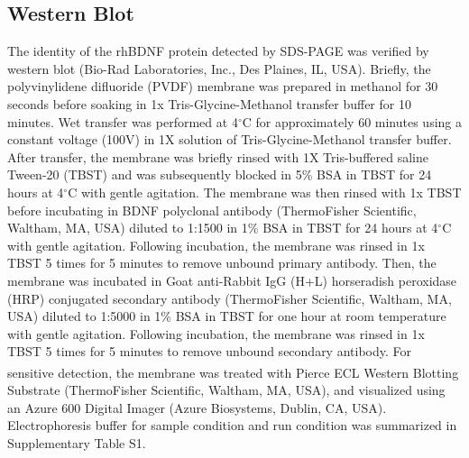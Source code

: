 \documentclass[review]{elsarticle}
\begin{document}
\subsection{Western Blot} 
The identity of the rhBDNF protein detected by SDS-PAGE was verified by western blot (Bio-Rad Laboratories, Inc., Des Plaines, IL, USA). Briefly, the polyvinylidene difluoride (PVDF) membrane was prepared in methanol for 30 seconds before soaking in 1x Tris-Glycine-Methanol transfer buffer for 10 minutes. Wet transfer was performed at 4$^\circ$C for approximately 60 minutes using a constant voltage (100V) in 1X solution of Tris-Glycine-Methanol transfer buffer. After transfer, the membrane was briefly rinsed with 1X Tris-buffered saline Tween-20 (TBST) and was subsequently blocked in 5\% BSA in TBST for 24 hours at 4$^\circ$C with gentle agitation. The membrane was then rinsed with 1x TBST before incubating in BDNF polyclonal antibody (ThermoFisher Scientific, Waltham, MA, USA) diluted to 1:1500 in 1\% BSA in TBST for 24 hours at 4$^\circ$C with gentle agitation. Following incubation, the membrane was rinsed in 1x TBST 5 times for 5 minutes to remove unbound primary antibody. Then, the membrane was incubated in Goat anti-Rabbit IgG (H+L) horseradish peroxidase (HRP) conjugated secondary antibody (ThermoFisher Scientific, Waltham, MA, USA) diluted to 1:5000 in 1\% BSA in TBST for one hour at room temperature with gentle agitation. Following incubation, the membrane was rinsed in 1x TBST 5 times for 5 minutes to remove unbound secondary antibody. For sensitive detection, the membrane was treated with Pierce\textsuperscript{\texttrademark} ECL Western Blotting Substrate (ThermoFisher Scientific, Waltham, MA, USA), and visualized using an Azure 600 Digital Imager (Azure Biosystems, Dublin, CA, USA). Electrophoresis buffer for sample condition and run condition was summarized in Supplementary Table S1. 
\end{document}
